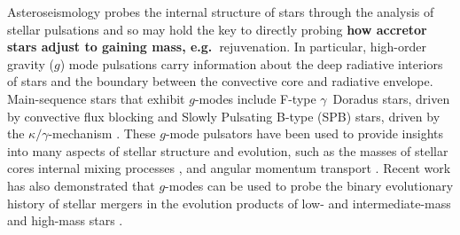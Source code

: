 \documentclass[twocolumn, twocolappendix, oneside]{aastex631}
\newcommand{\gmode}{$g$-mode\xspace}
\newcommand{\gmodes}{$g$-modes\xspace}
\begin{document}

Asteroseismology probes the internal structure of stars through the analysis of stellar pulsations \citep{Aerts+2010} and so may hold the key to directly probing {\bf how accretor stars adjust to gaining mass, e.g.\ }rejuvenation. %
In particular, high-order gravity ($g$) mode pulsations carry information about the deep radiative interiors of stars and the boundary between the convective core and radiative envelope. Main-sequence stars that exhibit \gmodes include F-type $\gamma$~Doradus stars, driven by convective flux blocking \citep{Guzik+2000} and Slowly Pulsating B-type (SPB) stars, driven by the $\kappa/\gamma$-mechanism \citep{Waelkens+1985, Waelkens+1991, Cox+1992, Pamyatnykh+1999}.
These \gmode pulsators have been used to provide insights into many aspects of stellar structure and evolution, such as the masses of stellar cores \citep{Johnston+2021, Pedersen+2022} internal mixing processes \citep{Pedersen+2018,Michielsen+2021}, and angular momentum transport \citep{Aerts+2019,Ouazzani2020,Salmon2022,Burssens+2023,Mombarg2023,Moyano2024}. Recent work has also demonstrated that \gmodes can be used to probe the binary evolutionary history of stellar mergers in the evolution products of low- and intermediate-mass \citep{Rui+2021} and high-mass stars \citep{Bellinger+2023:2023arXiv231100038B}.
\end{document}
